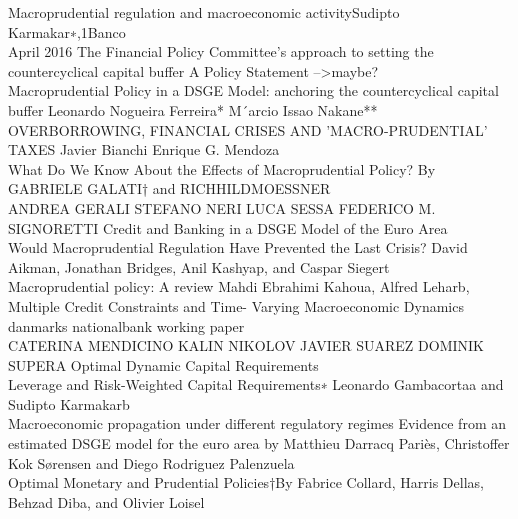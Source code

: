 \documentclass[12pt]{article}
\numberwithin{equation}{section}
\begin{document}
Macroprudential regulation and macroeconomic activitySudipto Karmakar∗,1Banco \\

April 2016
The Financial Policy Committee’s approach to
setting the countercyclical capital buffer
A Policy Statement -->maybe? \\


Macroprudential Policy in a DSGE Model: anchoring the
countercyclical capital buffer
Leonardo Nogueira Ferreira*
M´arcio Issao Nakane** \\


OVERBORROWING, FINANCIAL CRISES AND 'MACRO-PRUDENTIAL' TAXES
Javier Bianchi
Enrique G. Mendoza \\


What Do We Know About the Effects of Macroprudential
Policy?
By GABRIELE GALATI† and RICHHILDMOESSNER \\


ANDREA GERALI
STEFANO NERI
LUCA SESSA
FEDERICO M. SIGNORETTI
Credit and Banking in a DSGE Model of the
Euro Area \\



Would Macroprudential Regulation Have
Prevented the Last Crisis?
David Aikman, Jonathan Bridges, Anil Kashyap,
and Caspar Siegert \\


Macroprudential policy: A review
Mahdi Ebrahimi Kahoua, Alfred Leharb, \\


Multiple Credit
Constraints and Time-
Varying Macroeconomic
Dynamics danmarks nationalbank working paper \\


CATERINA MENDICINO
KALIN NIKOLOV
JAVIER SUAREZ
DOMINIK SUPERA
Optimal Dynamic Capital Requirements \\

Leverage and Risk-Weighted Capital
Requirements∗
Leonardo Gambacortaa and Sudipto Karmakarb \\

Macroeconomic
propagation
under different
regulatory
regimes
Evidence from an
estimated DSGE
model for the
euro area
by Matthieu Darracq Pariès,
Christoffer Kok Sørensen and
Diego Rodriguez Palenzuela \\


Optimal Monetary and Prudential Policies†By Fabrice Collard, Harris Dellas, Behzad Diba, and Olivier Loisel \\
\end{document}

